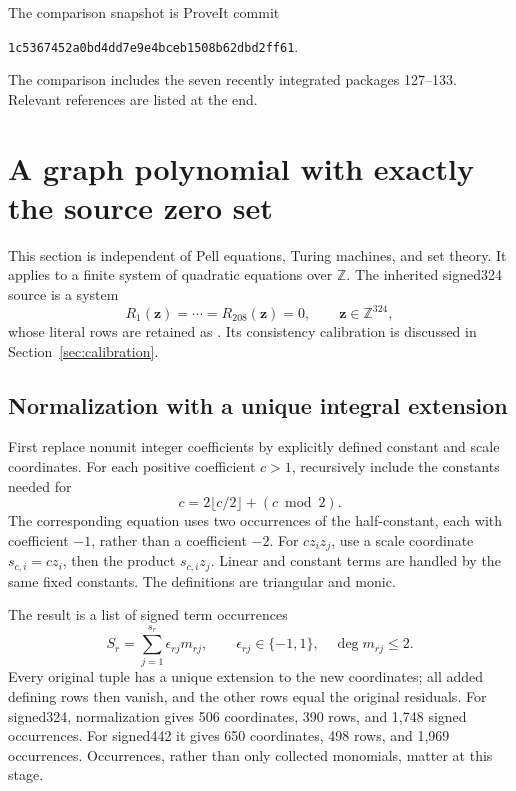 \documentclass[11pt,letterpaper]{article}
\theoremstyle{definition}\newtheorem{definition}[theorem]{Definition}
\theoremstyle{remark}\newtheorem{remark}[theorem]{Remark}
\newcommand{\Z}{\mathbb Z}\newcommand{\N}{\mathbb N}
\newcommand{\file}[1]{\path{#1}}
\begin{document}
\begin{minipage}{\textwidth}
The comparison snapshot is ProveIt commit
\begin{center}\small
\texttt{1c5367452a0bd4dd7e9e4bceb1508b62dbd2ff61}.
\end{center}
The comparison includes the seven recently integrated packages 127--133.
Relevant references are listed at the end.
\end{minipage}

\section{A graph polynomial with exactly the source zero set}

This section is independent of Pell equations, Turing machines, and set
theory. It applies to a finite system of quadratic equations over \(\Z\).
The inherited signed324 source is a system
\[
 R_1(\mathbf z)=\cdots=R_{208}(\mathbf z)=0,
 \qquad \mathbf z\in\Z^{324},
\]
whose literal rows are retained as \file{graph/source324/equation.json}.
Its consistency calibration is discussed in Section~\ref{sec:calibration}.

\subsection{Normalization with a unique integral extension}

First replace nonunit integer coefficients by explicitly defined constant
and scale coordinates. For each positive coefficient \(c>1\), recursively
include the constants needed for
\[
 c=2\lfloor c/2\rfloor+(c\bmod2).
\]
The corresponding equation uses two occurrences of the half-constant,
each with coefficient \(-1\), rather than a coefficient \(-2\).
For \(c z_i z_j\), use a scale coordinate \(s_{c,i}=c z_i\), then
the product \(s_{c,i}z_j\). Linear and constant terms are handled by the
same fixed constants. The definitions are triangular and monic.

The result is a list of signed term occurrences
\[
 S_r=\sum_{j=1}^{s_r}\epsilon_{rj}m_{rj},
 \qquad \epsilon_{rj}\in\{-1,1\},\quad\deg m_{rj}\le2.
\]
Every original tuple has a unique extension to the new coordinates;
all added defining rows then vanish, and the other rows equal the
original residuals. For signed324, normalization gives 506 coordinates,
390 rows, and 1,748 signed occurrences. For signed442 it gives 650
coordinates, 498 rows, and 1,969 occurrences. Occurrences, rather than
only collected monomials, matter at this stage.
\end{document}
